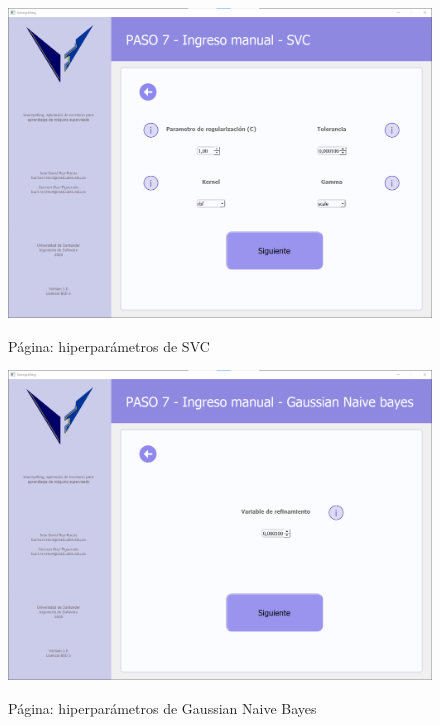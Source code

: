 \begin{figure}[H]
    \centering
    \caption{Página: hiperparámetros de SVC}
    \includegraphics[width=\textwidth]{images/svc.png}
    \label{fig:svc}
\end{figure}

\begin{figure}[H]
    \centering
    \caption{Página: hiperparámetros de Gaussian Naive Bayes}
    \includegraphics[width=\textwidth]{images/gaussianNB.png}
    \label{fig:gassianNB}
\end{figure}

